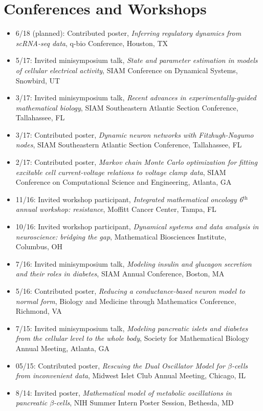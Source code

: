 \documentclass[11pt]{cv}
\begin{document}
\section*{Conferences and Workshops}
\label{sec:org96a7679}
\begin{itemize}
\item 6/18 (planned): Contributed poster, \emph{Inferring regulatory dynamics from scRNA-seq data}, q-bio Conference, Houston, TX\\
\item 5/17: Invited minisymposium talk, \emph{State and parameter estimation in models of cellular electrical activity}, SIAM Conference on Dynamical Systems, Snowbird, UT\\
\item 3/17: Invited minisymposium talk, \emph{Recent advances in experimentally-guided mathematical biology}, SIAM Southeastern Atlantic Section Conference, Tallahassee, FL\\
\item 3/17: Contributed poster, \emph{Dynamic neuron networks with Fitzhugh-Nagumo nodes}, SIAM Southeastern Atlantic Section Conference, Tallahassee, FL\\
\item 2/17: Contributed poster, \emph{Markov chain Monte Carlo optimization for fitting excitable cell current-voltage relations to voltage clamp data}, SIAM Conference on Computational Science and Engineering, Atlanta, GA\\
\item 11/16: Invited workshop participant, \emph{Integrated mathematical oncology 6\(^{\text{th}}\) annual workshop: resistance}, Moffitt Cancer Center, Tampa, FL\\
\item 10/16: Invited workshop participant, \emph{Dynamical systems and data analysis in neuroscience: bridging the gap}, Mathematical Biosciences Institute, Columbus, OH\\
\item 7/16: Invited minisymposium talk, \emph{Modeling insulin and glucagon secretion and their roles in diabetes}, SIAM Annual Conference, Boston, MA\\
\item 5/16: Contributed poster, \emph{Reducing a conductance-based neuron model to normal form}, Biology and Medicine through Mathematics Conference, Richmond, VA\\
\item 7/15: Invited minisymposium talk, \emph{Modeling pancreatic islets and diabetes from the cellular level to the whole body}, Society for Mathematical Biology Annual Meeting, Atlanta, GA\\
\item 05/15: Contributed poster, \emph{Rescuing the Dual Oscillator Model for \(\beta\)-cells from inconvenient data}, Midwest Islet Club Annual Meeting, Chicago, IL\\
\item 8/14: Invited poster, \emph{Mathematical model of metabolic oscillations in pancreatic \(\beta\)-cells}, NIH Summer Intern Poster Session, Bethesda, MD\\
\end{itemize}
\end{document}
